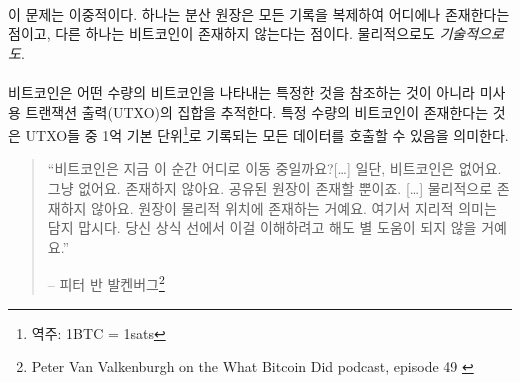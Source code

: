 \paragraph{}
이 문제는 이중적이다. 하나는 분산 원장은 모든 기록을 복제하여 어디에나 존재한다는 점이고, 다른 하나는 비트코인이 존재하지 않는다는 점이다. 
물리적으로도 \textit{기술적으로도}.

\paragraph{}
비트코인은 어떤 수량의 비트코인을 나타내는 특정한 것을 참조하는 것이 아니라 미사용 트랜잭션 출력(UTXO)의 집합을 추적한다.
특정 수량의 비트코인이 존재한다는 것은 UTXO들 중 1억 기본 단위\footnote{역주: 1BTC = 1sats}로 기록되는 모든 데이터를 호출할 수 있음을 의미한다. 

\begin{quotation}\begin{samepage}
		\enquote{비트코인은 지금 이 순간 어디로 이동 중일까요?[\ldots] 일단, 비트코인은
			없어요. 그냥 없어요. 존재하지 않아요. 공유된 원장이 존재할 뿐이죠. [\ldots] 
			물리적으로 존재하지 않아요. 원장이 물리적 위치에 존재하는 거예요.
			여기서 지리적 의미는 담지 맙시다. 당신 상식 선에서 이걸 이해하려고 해도 별 도움이 되지 않을 거예요.}
		\begin{flushright} -- 피터 반 발켄버그\footnote{Peter Van Valkenburgh on the What Bitcoin Did podcast, episode 49 \cite{wbd049}}
\end{flushright}\end{samepage}\end{quotation}

